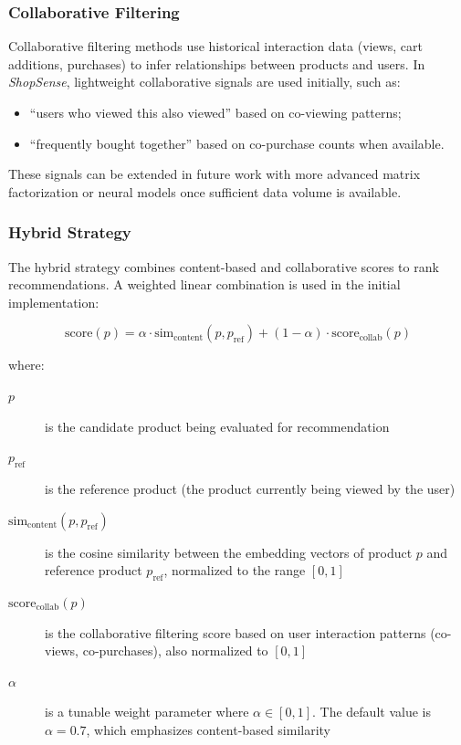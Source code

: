 \subsubsection*{Collaborative Filtering}
Collaborative filtering methods use historical interaction data (views, cart additions, purchases) to infer relationships between products and users. In \textit{ShopSense}, lightweight collaborative signals are used initially, such as:
\begin{itemize}
  \item ``users who viewed this also viewed'' based on co-viewing patterns;
  \item ``frequently bought together'' based on co-purchase counts when available.
\end{itemize}
These signals can be extended in future work with more advanced matrix factorization or neural models once sufficient data volume is available.

\subsubsection*{Hybrid Strategy}
The hybrid strategy combines content-based and collaborative scores to rank recommendations. A weighted linear combination is used in the initial implementation:

\begin{equation}
  \text{score}(p) = \alpha \cdot \text{sim}_{\text{content}}(p, p_{\text{ref}}) + (1 - \alpha) \cdot \text{score}_{\text{collab}}(p)
  \label{eq:hybrid-score}
\end{equation}

where:
\begin{description}
  \item[$p$] is the candidate product being evaluated for recommendation
  \item[$p_{\text{ref}}$] is the reference product (the product currently being viewed by the user)
  \item[$\text{sim}_{\text{content}}(p, p_{\text{ref}})$] is the cosine similarity between the embedding vectors of product $p$ and reference product $p_{\text{ref}}$, normalized to the range $[0,1]$
  \item[$\text{score}_{\text{collab}}(p)$] is the collaborative filtering score based on user interaction patterns (co-views, co-purchases), also normalized to $[0,1]$
  \item[$\alpha$] is a tunable weight parameter where $\alpha \in [0, 1]$. The default value is $\alpha = 0.7$, which emphasizes content-based similarity
\end{description}

